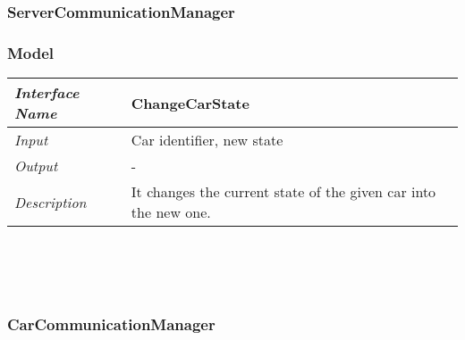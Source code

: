 \documentclass[11pt,a4paper]{report}
\begin{document}
\subsubsection{ServerCommunicationManager}
\subsubsection{Model}
\begin{tabularx}{\textwidth}{|>{\em}l|X|}
	\hline
	Interface Name& ChangeCarState\\
	\hline
	Input & Car identifier, new state\\
	\hline
	Output & -\\
	\hline
	Description &It changes the current state of the given car into the new one.\\
	\hline
\end{tabularx}
\\
\\
\\
\subsubsection{CarCommunicationManager}
\end{document}
